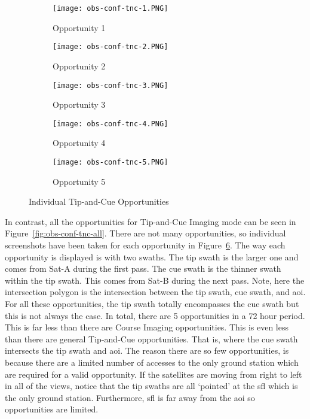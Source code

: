 \begin{figure}
    \centering
    \begin{subfigure}[b]{0.45\textwidth}
	\centering
	\texttt{[image: obs-conf-tnc-1.PNG]} 
	\caption{Opportunity 1}
	\label{fig:obs-conf-tnc-1} 
    \end{subfigure}
    \hfill
    \begin{subfigure}[b]{0.45\textwidth}
	\centering
	\texttt{[image: obs-conf-tnc-2.PNG]} 
	\caption{Opportunity 2}
	\label{fig:obs-conf-tnc-2} 
    \end{subfigure}
    \hfill
    \begin{subfigure}[b]{0.45\textwidth}
	\centering
	\texttt{[image: obs-conf-tnc-3.PNG]} 
	\caption{Opportunity 3}
	\label{fig:obs-conf-tnc-3} 
    \end{subfigure}
    
    \begin{subfigure}[b]{0.45\textwidth}
	\centering
	\texttt{[image: obs-conf-tnc-4.PNG]} 
	\caption{Opportunity 4}
	\label{fig:obs-conf-tnc-4} 
    \end{subfigure}
    \quad \quad
    \begin{subfigure}[b]{0.45\textwidth}
	\centering
	\texttt{[image: obs-conf-tnc-5.PNG]} 
	\caption{Opportunity 5}
	\label{fig:obs-conf-tnc-5} 
    \end{subfigure}

    \caption{Individual Tip-and-Cue Opportunities}
\label{fig:obs-conf-tnc-opps}
\end{figure}


In contrast, all the opportunities for Tip-and-Cue Imaging mode can be seen in
Figure~\ref{fig:obs-conf-tnc-all}. There are not many opportunities, so
individual screenshots have been taken for each opportunity in
Figure~\ref{fig:obs-conf-tnc-opps}. The way each opportunity is displayed is
with two swaths.  The tip swath is the larger one and comes from Sat-A during
the first pass. The cue swath is the thinner swath within the tip swath. This
comes from Sat-B during the next pass. Note, here the intersection polygon is
the intersection between the tip swath, cue swath, and \gls{aoi}. For all these
opportunities, the tip swath totally encompasses the cue swath but this is not
always the case. In total, there are 5 opportunities in a 72 hour period. This
is far less than there are Course Imaging opportunities. This is even less than
there are general Tip-and-Cue opportunities. That is, where the cue swath
intersects the tip swath and \gls{aoi}. The reason there are so few
opportunities, is because there are a limited number of accesses to the only
ground station which are required for a valid opportunity. If the satellites
are moving from right to left in all of the views, notice that the tip swaths
are all `pointed' at the \gls{sfl} which is the only ground station.
Furthermore, \gls{sfl} is far away from the \gls{aoi} so opportunities are
limited.



